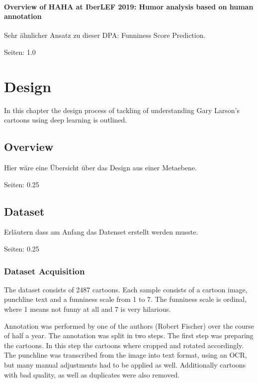 \documentclass[draft,final,oneside]{vutinfth} %
\begin{document}
\cite{chen2018humor}

\subsubsection{Overview of HAHA at IberLEF 2019: Humor analysis based on human annotation}

Sehr ähnlicher Ansatz zu dieser DPA: Funniness Score Prediction.

\cite{chiruzzo2019overview}

Seiten: 1.0


\chapter{Design} \label{design}

In this chapter the design process of tackling of understanding Gary Larson's cartoons using deep learning is outlined.

\section{Overview}

Hier wäre eine Übersicht über das Design aus einer Metaebene.

Seiten: 0.25

\section{Dataset}

Erläutern dass am Anfang das Datenset erstellt werden musste.

Seiten: 0.25

\subsection{Dataset Acquisition}
The dataset consists of 2487 cartoons. Each sample consists of a cartoon image, punchline text and a funniness scale from 1 to 7. The funniness scale is ordinal, where 1 means not funny at all and 7 is very hilarious.

Annotation was performed by one of the authors (Robert Fischer) over the course of half a year. The annotation was split in two steps. The first step was preparing the cartoons. In this step the cartoons where cropped and rotated accordingly. The punchline was transcribed from the image into text format, using an OCR, but many manual adjustments had to be applied as well. Additionally cartoons with bad quality, as well as duplicates were also removed.
\end{document}
